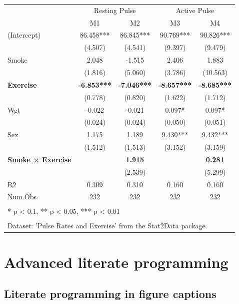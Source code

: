 \documentclass[
  11pt,
]{scrartcl}
\begin{document}
\begin{table}[H]
\centering
\begin{tabular}[t]{lcccc}
\toprule
\multicolumn{1}{c}{ } & \multicolumn{2}{c}{Resting Pulse} & \multicolumn{2}{c}{Active Pulse} \\
\cmidrule(l{3pt}r{3pt}){2-3} \cmidrule(l{3pt}r{3pt}){4-5}
  & M1 & M2 & M3 & M4\\
\midrule
(Intercept) & 86.458*** & 86.845*** & 90.769*** & 90.826***\\
 & (4.507) & (4.541) & (9.397) & (9.479)\\
Smoke & 2.048 & -1.515 & 2.406 & 1.883\\
 & (1.816) & (5.060) & (3.786) & (10.563)\\
\textbf{Exercise} & \textbf{-6.853***} & \textbf{-7.046***} & \textbf{-8.657***} & \textbf{-8.685***}\\
 & (0.778) & (0.820) & (1.622) & (1.712)\\
Wgt & -0.022 & -0.021 & 0.097* & 0.097*\\
 & (0.024) & (0.024) & (0.050) & (0.051)\\
Sex & 1.175 & 1.189 & 9.430*** & 9.432***\\
 & (1.512) & (1.513) & (3.152) & (3.159)\\
\textbf{Smoke × Exercise} & \textbf{} & \textbf{1.915} & \textbf{} & \textbf{0.281}\\
 &  & (2.539) &  & (5.299)\\
\midrule
R2 & 0.309 & 0.310 & 0.160 & 0.160\\
Num.Obs. & 232 & 232 & 232 & 232\\
\bottomrule
\multicolumn{5}{l}{\textsuperscript{} * p < 0.1, ** p < 0.05, *** p < 0.01}\\
\multicolumn{5}{l}{\textsuperscript{} Dataset: 'Pulse Rates and Exercise' from the Stat2Data package.}\\
\end{tabular}
\end{table}

\newpage

\hypertarget{advanced-literate-programming}{%
\section{Advanced literate programming}\label{advanced-literate-programming}}

\hypertarget{literate-programming-in-figure-captions}{%
\subsection{Literate programming in figure captions}\label{literate-programming-in-figure-captions}}
\end{document}
